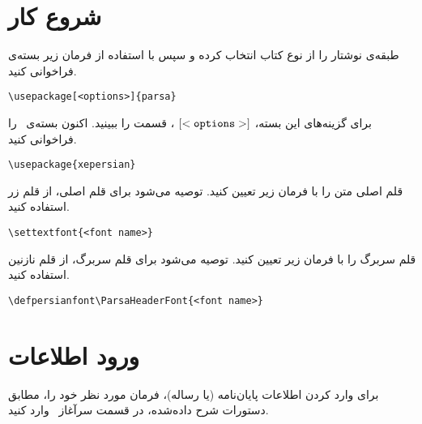 \documentclass[%
12pt,%
twoside, %
openany, %
notitlepage,%
fleqn,%
]{article}
\numberwithin{equation}{section} %
\begin{document}
\section{شروع کار}
طبقه‌ی نوشتار  را از نوع کتاب انتخاب کرده و سپس با استفاده از فرمان زیر بسته‌ی  فراخوانی کنید\@.
\begin{latin}\begin{verbatim}
\usepackage[<options>]{parsa}
\end{verbatim} \end{latin}
برای گزینه‌های این بسته، $\tt{[<options>]}$ ، قسمت  را ببینید\@. اکنون بسته‌ی \XePersian ~را فراخوانی کنید\@.
\begin{latin}\begin{verbatim}
\usepackage{xepersian}
\end{verbatim} \end{latin}
قلم اصلی متن را با فرمان زیر تعیین کنید\@. توصیه می‌شود برای قلم اصلی، از قلم زر  استفاده کنید\@.
\begin{latin}\begin{verbatim}
\settextfont{<font name>}
\end{verbatim} \end{latin}
قلم سربرگ را با فرمان زیر تعیین کنید\@. توصیه می‌شود برای قلم سربرگ، از قلم نازنین  استفاده کنید\@.
\begin{latin}\begin{verbatim}
\defpersianfont\ParsaHeaderFont{<font name>}
\end{verbatim} \end{latin}

\section{ورود اطلاعات}
برای وارد کردن اطلاعات پایان‌نامه (یا رساله)، فرمان مورد نظر خود را، مطابق دستورات شرح داده‌شده، در قسمت سرآغاز ~وارد کنید.
\end{document}
